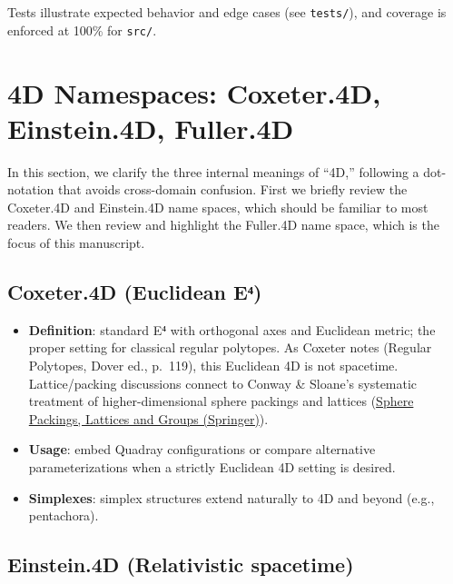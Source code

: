 \documentclass[
  10pt,
]{article}
\providecommand{\tightlist}{%
  \setlength{\itemsep}{0pt}\setlength{\parskip}{0pt}}
\begin{document}
Tests illustrate expected behavior and edge cases (see \texttt{tests/}),
and coverage is enforced at 100\% for \texttt{src/}. 

\hypertarget{d-namespaces-coxeter.4d-einstein.4d-fuller.4d}{%
\section{4D Namespaces: Coxeter.4D, Einstein.4D,
Fuller.4D}\label{d-namespaces-coxeter.4d-einstein.4d-fuller.4d}}

In this section, we clarify the three internal meanings of ``4D,''
following a dot-notation that avoids cross-domain confusion. First we
briefly review the Coxeter.4D and Einstein.4D name spaces, which should
be familiar to most readers. We then review and highlight the Fuller.4D
name space, which is the focus of this manuscript.

\hypertarget{coxeter.4d-euclidean-eux2074}{%
\subsection{Coxeter.4D (Euclidean
E⁴)}\label{coxeter.4d-euclidean-eux2074}}

\begin{itemize}
\tightlist
\item
  \textbf{Definition}: standard E⁴ with orthogonal axes and Euclidean
  metric; the proper setting for classical regular polytopes. As Coxeter
  notes (Regular Polytopes, Dover ed., p.~119), this Euclidean 4D is not
  spacetime. Lattice/packing discussions connect to Conway \& Sloane's
  systematic treatment of higher-dimensional sphere packings and
  lattices
  (\href{https://link.springer.com/book/10.1007/978-1-4757-6568-7}{Sphere
  Packings, Lattices and Groups (Springer)}).
\item
  \textbf{Usage}: embed Quadray configurations or compare alternative
  parameterizations when a strictly Euclidean 4D setting is desired.
\item
  \textbf{Simplexes}: simplex structures extend naturally to 4D and
  beyond (e.g., pentachora).
\end{itemize}

\hypertarget{einstein.4d-relativistic-spacetime}{%
\subsection{Einstein.4D (Relativistic
spacetime)}\label{einstein.4d-relativistic-spacetime}}
\end{document}
